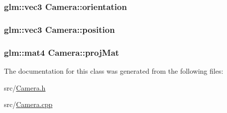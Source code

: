 \subsubsection[{\texorpdfstring{orientation}{orientation}}]{\setlength{\rightskip}{0pt plus 5cm}glm\+::vec3 Camera\+::orientation\hspace{0.3cm}{\ttfamily [protected]}}\hypertarget{class_camera_a1be00c1e1049e3f682094be8d85060a8}{}\label{class_camera_a1be00c1e1049e3f682094be8d85060a8}
\subsubsection[{\texorpdfstring{position}{position}}]{\setlength{\rightskip}{0pt plus 5cm}glm\+::vec3 Camera\+::position\hspace{0.3cm}{\ttfamily [protected]}}\hypertarget{class_camera_a04b5db2c530d8630660e8cfb93a4b3b5}{}\label{class_camera_a04b5db2c530d8630660e8cfb93a4b3b5}
\subsubsection[{\texorpdfstring{proj\+Mat}{projMat}}]{\setlength{\rightskip}{0pt plus 5cm}glm\+::mat4 Camera\+::proj\+Mat\hspace{0.3cm}{\ttfamily [protected]}}\hypertarget{class_camera_aac4ef81728f68a571955d72639f90f24}{}\label{class_camera_aac4ef81728f68a571955d72639f90f24}


The documentation for this class was generated from the following files\+:\begin{DoxyCompactItemize}
\item 
src/\hyperlink{_camera_8h}{Camera.\+h}\item 
src/\hyperlink{_camera_8cpp}{Camera.\+cpp}\end{DoxyCompactItemize}
